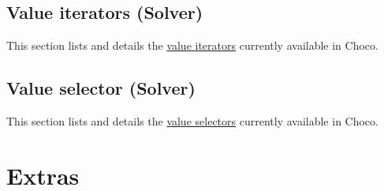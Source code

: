 \chapter{Value iterators (Solver)}\label{ch:valite}\hypertarget{ch:valite}{}
This section lists and details the \hyperlink{solver:valueiterator}{value iterators} currently available in Choco.





\chapter{Value selector (Solver)}\label{ch:valsel}\hypertarget{ch:valsel}{}
This section lists and details the \hyperlink{solver:valueselector}{value selectors} currently available in Choco.





%





\part{Extras}\label{ch:extra}\hypertarget{ch:extra}{}


